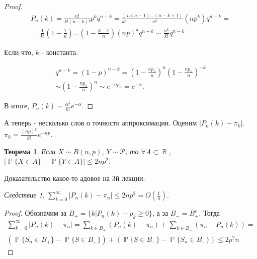 \documentclass[a4paper,100pt]{article}
\theoremstyle{indented}
\newtheorem{theorem}{Теорема}
\theoremstyle{definition}
\theoremstyle{remark}
\newtheorem{cons}{Следствие}
\DeclareMathOperator{\RR}{\mathbb{R}}
\DeclareMathOperator{\PP}{\mathbb{P}}
\begin{document}
\begin{proof}
  \begin{equation*}
      \begin{split}
          P_n(k)=\frac{n!}{k!(n-k)!}p^kq^{n-k}=\frac{1}{k!}\frac{n(n-1)\ldots(n-k+1)}{n^k}(np^k)q^{n-k}= \\ 
          = \frac{1}{k!}{(1-\frac{1}{n})\ldots(1-\frac{k-1}{n})}(np)^kq^{n-k}\sim\frac{\alpha^k}{k!}q^{n-k}
      \end{split}
  \end{equation*}

  Если что, $k$ - константа. 

  \begin{equation*}
      \begin{split}
          q^{n-k}=(1-p)^{n-k}=(1-\frac{n p_n}{n})^n(1-\frac{n p_n}{n})^{-k} \\ 
          \sim (1-\frac{n p_n}{n})^n \sim e^{-n p_n} = e^{-\alpha}. 
      \end{split}
  \end{equation*}

  В итоге, $P_n(k)\sim\frac{\alpha^k}{k!}e^{-\alpha}$. 

\end{proof}

А теперь - несколько слов о точности аппроксимации. Оценим $|P_n(k)-\pi_k|$. $\pi_k=\frac{(np)^k}{k!}e^{-np}$. \\

\begin{theorem}
  Если $X \sim B(n, p)$, $Y \sim \mathcal{P}$, то $\forall A \subset \RR$, $|\PP\{X \in A\} - \PP \{ Y \in A \}|\leq 2np^2$.
\end{theorem}
Доказательство какое-то адовое на 3й лекции.

\begin{cons}
  $\sum_{k=0}^\infty|P_n(k)-\pi_n|\leq 2np^2 = O(\frac{1}{n})$.
\end{cons}
\begin{proof}
  Обозначим за $B_+ = \{k| P_n(k) - p_k \ge 0 \}$, а за $B_- = B_+^c$. Тогда 
  \begin{equation*}
      \begin{split}
          \sum_{k=0}^\infty \left| P_n(k)-\pi_n \right| = 
          \sum_{k \in B_+} (P_n(k)-\pi_n) + \sum_{k \in B_-} (\pi_n - P_n(k)) = \\
          \left( \PP \{ S_n \in B_+\} - \PP \{S \in B_+ \} \right) + \left(\PP \{ S \in B_-\} - \PP \{S_n \in B_- \}\right) \le 2p^2n
      \end{split}
  \end{equation*}
\end{proof}
\end{document}
